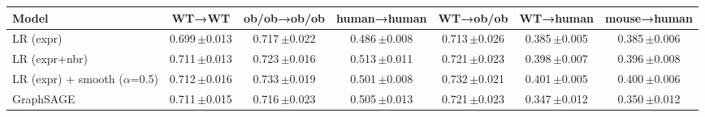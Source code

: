 \begin{tabular}{lcccccc}
\toprule
Model & WT→WT & ob/ob→ob/ob & human→human & WT→ob/ob & WT→human & mouse→human \\
\midrule
LR (expr) & 0.699\,{\scriptsize$\pm$0.013} & 0.717\,{\scriptsize$\pm$0.022} & 0.486\,{\scriptsize$\pm$0.008} & 0.713\,{\scriptsize$\pm$0.026} & 0.385\,{\scriptsize$\pm$0.005} & 0.385\,{\scriptsize$\pm$0.006} \\
LR (expr+nbr) & 0.711\,{\scriptsize$\pm$0.013} & 0.723\,{\scriptsize$\pm$0.016} & 0.513\,{\scriptsize$\pm$0.011} & 0.721\,{\scriptsize$\pm$0.023} & 0.398\,{\scriptsize$\pm$0.007} & 0.396\,{\scriptsize$\pm$0.008} \\
LR (expr) + smooth ($\alpha$=0.5) & 0.712\,{\scriptsize$\pm$0.016} & 0.733\,{\scriptsize$\pm$0.019} & 0.501\,{\scriptsize$\pm$0.008} & 0.732\,{\scriptsize$\pm$0.021} & 0.401\,{\scriptsize$\pm$0.005} & 0.400\,{\scriptsize$\pm$0.006} \\
GraphSAGE & 0.711\,{\scriptsize$\pm$0.015} & 0.716\,{\scriptsize$\pm$0.023} & 0.505\,{\scriptsize$\pm$0.013} & 0.721\,{\scriptsize$\pm$0.023} & 0.347\,{\scriptsize$\pm$0.012} & 0.350\,{\scriptsize$\pm$0.012} \\
\bottomrule
\end{tabular}
